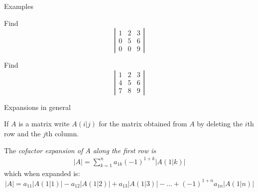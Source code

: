 \documentclass{beamer}
\begin{document}
\begin{frame}{Examples}
  \begin{example}
    Find
    \begin{equation*}
      \left|
	\begin{array}{ccc}
          1&2&3\\
          0&5&6\\
          0&0&9
	\end{array}
      \right|
    \end{equation*}
  \end{example}\vfill
  \begin{example}
    Find
    \begin{equation*}
      \left|
	\begin{array}{ccc}
          1&2&3\\
          4&5&6\\
          7&8&9
	\end{array}
      \right|
    \end{equation*}
  \end{example}
\end{frame}

\begin{frame}{Expansions in general}
  \begin{definition}
    If $A$ is a matrix write $A(i|j)$ for the matrix obtained from $A$ by deleting the $i$th row and the $j$th column.
  \end{definition}
  \begin{definition}
    The \emph{cofactor expansion of $A$ along the first row is}
    \begin{align*}
      \left|A\right| = \sum_{k=1}^na_{1k}(-1)^{1+k}\left| A(1| k) \right|
    \end{align*}
    which when expanded is:
    \begin{equation*}
      \left|A\right|= a_{11}\left| A(1| 1) \right|-a_{12}\left| A(1| 2) \right|+a_{13}\left| A(1| 3) \right|-\dots+(-1)^{1+n}a_{1n}\left| A(1| n) \right|
    \end{equation*}
  \end{definition}
\end{frame}
\end{document}
